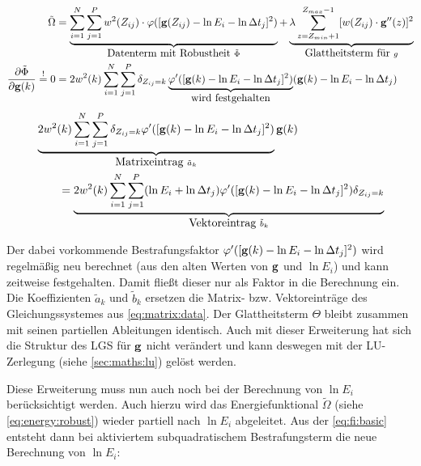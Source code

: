\begin{align}
\label{eq:energy:robust}
\tilde{\Omega} &= 
    \underbrace{\sum_{i=1}^{N} \sum_{j=1}^{P} w^2(Z_{ij})
    \cdot \varphi([\mathbf g(Z_{ij}) - \ln E_i - \ln \Delta t_j]^2)}_{\mbox{Datenterm mit Robustheit }\tilde{\Phi}}
    + \underbrace{\lambda  \sum_{z=Z_{min}+1}^{Z_{max}-1} [w(Z_{ij}) \cdot \mathbf g''(z)]^2}_{\mbox{Glattheitsterm für }g}\\
\frac{\partial \tilde{\Phi}}{\partial \mathbf g(k)} \overset{!}{=} 0 &= 
    2 w^2(k) \sum_{i=1}^{N} \sum_{j=1}^{P}\delta_{Z_{ij}=k} 
    \underbrace{
        \varphi'(
            [\mathbf g(k)-\ln E_i - \ln \Delta t_j]^2
        )
    }_{\mbox{wird festgehalten}}
    (\mathbf g(k)-\ln E_i - \ln \Delta t_j)
\end{align}
\begin{align}
    &\underbrace{
        2w^2(k)\sum_{i=1}^{N} \sum_{j=1}^{P}  
            \delta_{Z_{ij}=k}
            \varphi'(
                [\mathbf g(k)-\ln E_i - \ln \Delta t_j]^2
            )
    }_{\mbox{Matrixeintrag } \tilde{a}_k}\mathbf g(k) \nonumber \\
    &\qquad= 
    \underbrace{
        2w^2(k)\sum_{i=1}^{N} \sum_{j=1}^{P} 
            (\ln E_i +\ln \Delta t_j)
            \varphi'(
                [\mathbf g(k)-\ln E_i - \ln \Delta t_j]^2
            )
            \delta_{Z_{ij}=k}
    }_{\mbox{Vektoreintrag }\tilde{b}_k}
\end{align}

Der dabei vorkommende Bestrafungsfaktor $\varphi'([\mathbf g(k)-\ln E_i - \ln \Delta t_j]^2)$ wird regelmäßig neu berechnet  (aus den alten Werten von $\mathbf g$ und $\ln E_i$) und kann zeitweise festgehalten. Damit fließt dieser nur als Faktor in die Berechnung ein. Die Koeffizienten $\tilde a_k$ und $\tilde b_k$ ersetzen die Matrix- bzw. Vektoreinträge des Gleichungssystemes aus \autoref{eq:matrix:data}. Der Glattheitsterm $\Theta$ bleibt zusammen mit seinen partiellen Ableitungen identisch. Auch mit dieser Erweiterung hat sich die Struktur des LGS für $\mathbf g$ nicht verändert und kann deswegen mit der LU-Zerlegung (siehe \autoref{sec:maths:lu}) gelöst werden. 

\label{subsec:robust:e:daten}
Diese Erweiterung muss nun auch noch bei der Berechnung von $\ln E_i$ berücksichtigt werden. Auch hierzu wird das Energiefunktional $\tilde{\Omega}$ (siehe \autoref{eq:energy:robust}) wieder partiell nach $\ln E_i$ abgeleitet. Aus der \autoref{eq:fi:basic} entsteht dann bei aktiviertem subquadratischem Bestrafungsterm die neue Berechnung von $\ln E_i$:

